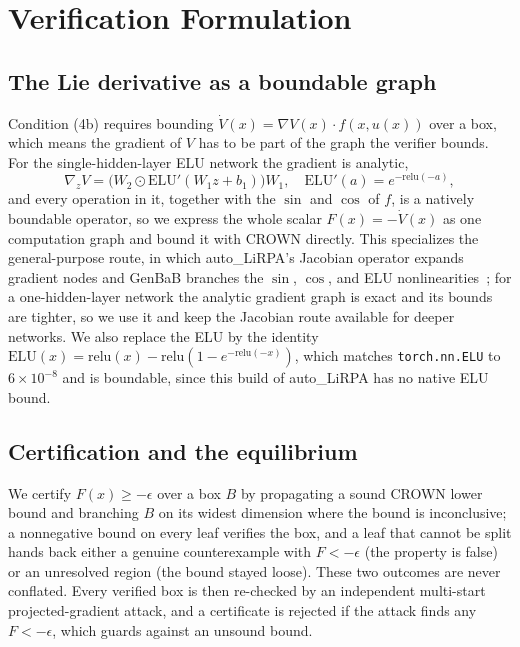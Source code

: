 \documentclass[letterpaper,journal]{IEEEtran}
\newcommand{\Lie}{\dot{V}}
\begin{document}
\section{Verification Formulation}
\subsection{The Lie derivative as a boundable graph}
Condition (4b) requires bounding $\Lie(x)=\nabla V(x)\cdot f(x,u(x))$ over a box,
which means the gradient of $V$ has to be part of the graph the verifier bounds.
For the single-hidden-layer ELU network the gradient is analytic,
\begin{equation}
\nabla_z V = \big(W_2 \odot \mathrm{ELU}'(W_1 z + b_1)\big) W_1,
\quad \mathrm{ELU}'(a)=e^{-\mathrm{relu}(-a)},
\end{equation}
and every operation in it, together with the $\sin$ and $\cos$ of $f$, is a
natively boundable operator, so we express the whole scalar
$F(x)=-\Lie(x)$ as one computation graph and bound it with CROWN directly. This
specializes the general-purpose route, in which auto\_LiRPA's Jacobian operator
expands gradient nodes and GenBaB branches the $\sin$, $\cos$, and ELU
nonlinearities~\cite{shi2024genbab,tutorial2026abcrown}; for a one-hidden-layer
network the analytic gradient graph is exact and its bounds are tighter, so we use
it and keep the Jacobian route available for deeper networks. We also replace the
ELU by the identity $\mathrm{ELU}(x)=\mathrm{relu}(x)-\mathrm{relu}(1-e^{-\mathrm{relu}(-x)})$,
which matches \texttt{torch.nn.ELU} to $6\times 10^{-8}$ and is boundable, since
this build of auto\_LiRPA has no native ELU bound.

\subsection{Certification and the equilibrium}
We certify $F(x)\ge -\epsilon$ over a box $B$ by propagating a sound CROWN lower
bound and branching $B$ on its widest dimension where the bound is inconclusive; a
nonnegative bound on every leaf verifies the box, and a leaf that cannot be split
hands back either a genuine counterexample with $F<-\epsilon$ (the property is
false) or an unresolved region (the bound stayed loose). These two outcomes are
never conflated. Every verified box is then re-checked by an independent
multi-start projected-gradient attack, and a certificate is rejected if the attack
finds any $F<-\epsilon$, which guards against an unsound bound.
\end{document}
